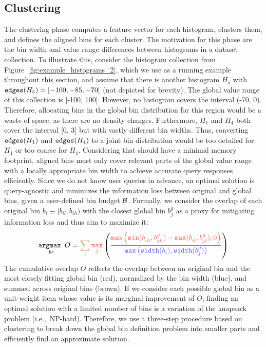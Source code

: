 \subsection{Clustering}
\label{sec:clustering}

The clustering phase computes a feature vector for each histogram, clusters them, and defines the aligned bins for each cluster.
The motivation for this phase are the bin width and value range differences between histograms in a dataset collection.
To illustrate this, consider the histogram collection from Figure~\ref{fig:example_histograms_2}, which we use as a running example throughout this section, and assume that there is another histogram $H_5$ with $\edges{H_5} = [-100, -85, -70]$ (not depicted for brevity).
The global value range of this collection is [-100, 100].
However, no histogram covers the interval (-70, 0).
Therefore, allocating bins in the global bin distribution for this region would be a waste of space, as there are no density changes.
Furthermore, $H_1$ and $H_4$ both cover the interval [0, 3] but with vastly different bin widths.
Thus, converting $\edges{H_1}$ and $\edges{H_4}$ to a joint bin distribution would be too detailed for $H_1$ or too coarse for $H_4$.
Considering that \system{} should have a minimal memory footprint, aligned bins must only cover relevant parts of the global value range with a locally appropriate bin width to achieve accurate query responses efficiently.
Since we do not know user queries in advance, an optimal solution is query-agnostic and minimizes the information loss between original and global bins, given a user-defined bin budget $\mathcal{B}$.
Formally, we consider the overlap of each original bin $b_i \equiv [b_{il}, b_{ih})$ with the closest global bin $b_j^g$ as a proxy for mitigating information loss and thus aim to maximize it:
\begin{equation}
\label{eq:overlap_optimization}
\underset{b^g}{\FuncSty{argmax }} O = \mathcolor{brown!80}{\sum_{i}} \mathcolor{red!70}{\underset{j}{\FuncSty{max}}} \left( \frac{\mathcolor{red!70}{\FuncSty{max} \left(\FuncSty{min}(b^{}_{ih}, b^g_{jh}) - \FuncSty{max}(b^{}_{il}, b^g_{jl}), 0\right)}}{\mathcolor{blue!70}{\FuncSty{max}\left(\FuncSty{width}(b_i), \FuncSty{width}(b_j^g)\right)}} \right)
\end{equation}
The cumulative overlap $O$ reflects the overlap between an original bin and the most closely fitting global bin (red), normalized by the bin width (blue), and summed across original bins (brown).
If we consider each possible global bin as a unit-weight item whose value is its marginal improvement of $O$, finding an optimal solution with a limited number of bins is a variation of the knapsack problem (i.e.,~NP-hard).
Therefore, we use a three-step procedure based on clustering to break down the global bin definition problem into smaller parts and efficiently find an approximate solution.

